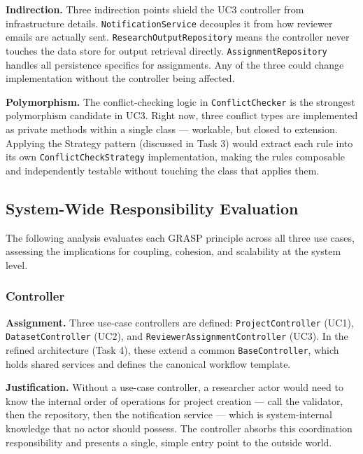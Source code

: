 \documentclass[12pt,a4paper]{article}
\newcommand{\code}[1]{\texttt{\small #1}}
\begin{document}
\noindent\textbf{Indirection.}
Three indirection points shield the UC3 controller from infrastructure details. \code{NotificationService} decouples it from how reviewer emails are actually sent. \code{ResearchOutputRepository} means the controller never touches the data store for output retrieval directly. \code{AssignmentRepository} handles all persistence specifics for assignments. Any of the three could change implementation without the controller being affected.

\noindent\textbf{Polymorphism.}
The conflict-checking logic in \code{ConflictChecker} is the strongest polymorphism candidate in UC3. Right now, three conflict types are implemented as private methods within a single class --- workable, but closed to extension. Applying the Strategy pattern (discussed in Task 3) would extract each rule into its own \code{ConflictCheckStrategy} implementation, making the rules composable and independently testable without touching the class that applies them.

\subsection{System-Wide Responsibility Evaluation}

The following analysis evaluates each GRASP principle across all three use cases, assessing the implications for coupling, cohesion, and scalability at the system level.

\subsubsection{Controller}

\noindent\textbf{Assignment.}
Three use-case controllers are defined: \code{ProjectController} (UC1), \code{DatasetController} (UC2), and \code{ReviewerAssignmentController} (UC3). In the refined architecture (Task 4), these extend a common \code{BaseController}, which holds shared services and defines the canonical workflow template.

\noindent\textbf{Justification.}
Without a use-case controller, a researcher actor would need to know the internal order of operations for project creation --- call the validator, then the repository, then the notification service --- which is system-internal knowledge that no actor should possess. The controller absorbs this coordination responsibility and presents a single, simple entry point to the outside world.
\end{document}
